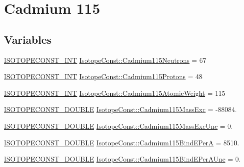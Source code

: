 \hypertarget{group___isotope_const-_cadmium-_cd115}{}\section{Cadmium 115}
\label{group___isotope_const-_cadmium-_cd115}
\subsection*{Variables}
\begin{DoxyCompactItemize}
\item 
\mbox{\hyperlink{group___isotope_const-_macros_ga5f18360b3e99483a35c32d789e62621c}{I\+S\+O\+T\+O\+P\+E\+C\+O\+N\+S\+T\+\_\+\+I\+NT}} \mbox{\hyperlink{group___isotope_const-_cadmium-_cd115_ga66c8103fc14bb925377c67dae4e96a62}{Isotope\+Const\+::\+Cadmium115\+Neutrons}} = 67
\item 
\mbox{\hyperlink{group___isotope_const-_macros_ga5f18360b3e99483a35c32d789e62621c}{I\+S\+O\+T\+O\+P\+E\+C\+O\+N\+S\+T\+\_\+\+I\+NT}} \mbox{\hyperlink{group___isotope_const-_cadmium-_cd115_gadcd91bfe35dfe544389a0aa8db02131b}{Isotope\+Const\+::\+Cadmium115\+Protons}} = 48
\item 
\mbox{\hyperlink{group___isotope_const-_macros_ga5f18360b3e99483a35c32d789e62621c}{I\+S\+O\+T\+O\+P\+E\+C\+O\+N\+S\+T\+\_\+\+I\+NT}} \mbox{\hyperlink{group___isotope_const-_cadmium-_cd115_ga7a3616971c02552c14ddcc5c707ee315}{Isotope\+Const\+::\+Cadmium115\+Atomic\+Weight}} = 115
\item 
\mbox{\hyperlink{group___isotope_const-_macros_ga8f45a7272ce02c0b4c65c44636ed719a}{I\+S\+O\+T\+O\+P\+E\+C\+O\+N\+S\+T\+\_\+\+D\+O\+U\+B\+LE}} \mbox{\hyperlink{group___isotope_const-_cadmium-_cd115_ga2ca65c94592af7f01c6820157f8c58d2}{Isotope\+Const\+::\+Cadmium115\+Mass\+Exc}} = -\/88084.
\item 
\mbox{\hyperlink{group___isotope_const-_macros_ga8f45a7272ce02c0b4c65c44636ed719a}{I\+S\+O\+T\+O\+P\+E\+C\+O\+N\+S\+T\+\_\+\+D\+O\+U\+B\+LE}} \mbox{\hyperlink{group___isotope_const-_cadmium-_cd115_ga6dbf190ca93d77c295d1d4d21fdb13fe}{Isotope\+Const\+::\+Cadmium115\+Mass\+Exc\+Unc}} = 0.
\item 
\mbox{\hyperlink{group___isotope_const-_macros_ga8f45a7272ce02c0b4c65c44636ed719a}{I\+S\+O\+T\+O\+P\+E\+C\+O\+N\+S\+T\+\_\+\+D\+O\+U\+B\+LE}} \mbox{\hyperlink{group___isotope_const-_cadmium-_cd115_ga4930fa2e9869504bd6b810349b1beadf}{Isotope\+Const\+::\+Cadmium115\+Bind\+E\+PerA}} = 8510.
\item 
\mbox{\hyperlink{group___isotope_const-_macros_ga8f45a7272ce02c0b4c65c44636ed719a}{I\+S\+O\+T\+O\+P\+E\+C\+O\+N\+S\+T\+\_\+\+D\+O\+U\+B\+LE}} \mbox{\hyperlink{group___isotope_const-_cadmium-_cd115_ga8bdd0c0e96c72fad46d21c2210df02b6}{Isotope\+Const\+::\+Cadmium115\+Bind\+E\+Per\+A\+Unc}} = 0.

\end{DoxyCompactItemize}
